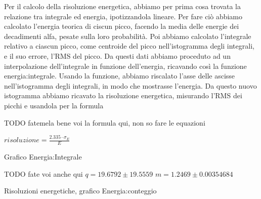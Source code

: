 Per il calcolo della risoluzione energetica, abbiamo per prima cosa trovata la relazione tra integrale ed energia, ipotizzandola lineare. 
Per fare ciò abbiamo calcolato l'energia teorica di ciscun picco, facendo la media delle energie dei decadimenti alfa, pesate sulla loro probabilità. 
Poi abbiamo calcolato l'integrale relativo a ciascun picco, come centroide del picco nell'istogramma degli integrali, e il suo errore, l'RMS del picco.
Da questi dati abbiamo proceduto ad un interpolazione dell'integrale in funzione dell'energia, ricavando così la funzione energia:integrale. 
Usando la funzione, abbiamo riscalato l'asse delle ascisse nell'istogramma degli integrali, in modo che mostrasse l'energia. 
Da questo nuovo istogramma abbiamo ricavato la risoluzione energetica, misurando l'RMS dei picchi e usandola per la formula

TODO fatemela bene voi la formula qui, non so fare le equazioni

$risoluzione=\frac{2.335\cdot\sigma_E}{E}$

\begin{grafico}
 \centering
 \resizebox{\textwidth}{!}{%
 
 }%
 \caption{Grafico Energia:Integrale} 
 \label{gr:energy_integral.tex} 
\end{grafico}

TODO fate voi anche qui
$q=19.6792\pm19.5559$
$m=1.2469\pm0.00354684$

\begin{grafico}
 \centering
 \caption{Risoluzioni energetiche, grafico Energia:conteggio} 
 \label{gr:600_energy.tex} 
\end{grafico}


